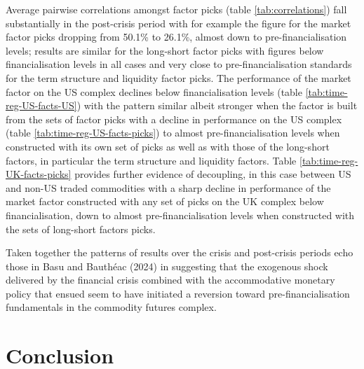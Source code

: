 \documentclass[]{elsarticle} %
\begin{document}
Average pairwise correlations amongst factor picks (table \ref{tab:correlations}) fall substantially in the post-crisis period with for example the figure for the market factor picks dropping from 50.1\% to 26.1\%, almost down to pre-financialisation levels; results are similar for the long-short factor picks with figures below financialisation levels in all cases and very close to pre-financialisation standards for the term structure and liquidity factor picks. The performance of the market factor on the US complex declines below financialisation levels (table \ref{tab:time-reg-US-facts-US}) with the pattern similar albeit stronger when the factor is built from the sets of factor picks with a decline in performance on the US complex (table \ref{tab:time-reg-US-facts-picks}) to almost pre-financialisation levels when constructed with its own set of picks as well as with those of the long-short factors, in particular the term structure and liquidity factors. Table \ref{tab:time-reg-UK-facts-picks} provides further evidence of decoupling, in this case between US and non-US traded commodities with a sharp decline in performance of the market factor constructed with any set of picks on the UK complex below financialisation, down to almost pre-financialisation levels when constructed with the sets of long-short factors picks.

\medskip\setlength{\parindent}{0pt}

Taken together the patterns of results over the crisis and post-crisis periods echo those in Basu and Bauthéac (2024) in suggesting that the exogenous shock delivered by the financial crisis combined with the accommodative monetary policy that ensued seem to have initiated a reversion toward pre-financialisation fundamentals in the commodity futures complex.

\newpage

\hypertarget{conclusion}{%
\section{Conclusion}\label{conclusion}}
\end{document}
